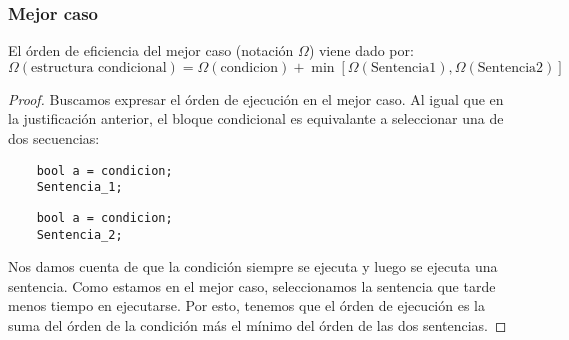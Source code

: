 \subsubsection{Mejor caso}
El órden de eficiencia del mejor caso (notación $\Omega$) viene dado por:
\begin{equation*}
\Omega(\text{estructura condicional}) = \Omega(\text{condicion}) + \min\left[\Omega(\text{Sentencia1}), \Omega(\text{Sentencia2})\right]
\end{equation*}
\begin{proof}
Buscamos expresar el órden de ejecución en el mejor caso. Al igual que en la justificación anterior, el bloque condicional es equivalante a seleccionar una de dos secuencias:
\begin{minipage}{0.5\textwidth}
    \begin{listing}[H]
        \begin{verbatim}
    bool a = condicion;
    Sentencia_1;
        \end{verbatim}
    \end{listing}
    \end{minipage}
    \begin{minipage}{0.5\textwidth}
    \begin{listing}[H]
        \begin{verbatim}
    bool a = condicion;
    Sentencia_2;
        \end{verbatim}
    \end{listing}
    \end{minipage}
Nos damos cuenta de que la condición siempre se ejecuta y luego se ejecuta una sentencia. Como estamos en el mejor caso, seleccionamos la sentencia que tarde menos tiempo en ejecutarse. Por esto, tenemos que el órden de ejecución es la suma del órden de la condición más el mínimo del órden de las dos sentencias.
\end{proof}

